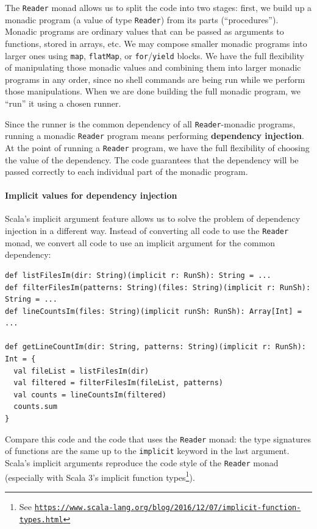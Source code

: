 The \lstinline!Reader! monad allows us to split the code into two
stages: first, we build up a monadic program (a value of type \lstinline!Reader!)
from its parts (\textsf{``}procedures\textsf{''}). Monadic programs are ordinary values
that can be passed as arguments to functions, stored in arrays, etc.
We may compose smaller monadic programs into larger ones using \lstinline!map!,
\lstinline!flatMap!, or \lstinline!for!/\lstinline!yield! blocks.
We have the full flexibility of manipulating those monadic values
and combining them into larger monadic programs in any order, since
no shell commands are being run while we perform those manipulations.
When we are done building the full monadic program, we \textsf{``}run\textsf{''} it
using a chosen runner.

Since the runner is the common dependency of all \lstinline!Reader!-monadic
programs, running a monadic \lstinline!Reader! program means performing
\textbf{dependency injection}. At the
point of running a \lstinline!Reader! program, we have the full flexibility
of choosing the value of the dependency. The code guarantees that
the dependency will be passed correctly to each individual part of
the monadic program.

\paragraph{Implicit values for dependency injection}

Scala\textsf{'}s implicit argument feature allows us to solve the problem of
dependency injection in a different way. Instead of converting all
code to use the \lstinline!Reader! monad, we convert all code to
use an implicit argument for the common dependency:
\begin{lstlisting}
def listFilesIm(dir: String)(implicit r: RunSh): String = ...
def filterFilesIm(patterns: String)(files: String)(implicit r: RunSh): String = ...
def lineCountsIm(files: String)(implicit runSh: RunSh): Array[Int] = ...

def getLineCountIm(dir: String, patterns: String)(implicit r: RunSh): Int = {
  val fileList = listFilesIm(dir)
  val filtered = filterFilesIm(fileList, patterns)
  val counts = lineCountsIm(filtered)
  counts.sum
}
\end{lstlisting}
Compare this code and the code that uses the \lstinline!Reader! monad:
the type signatures of functions are the same up to the \lstinline!implicit!
keyword in the last argument. Scala\textsf{'}s implicit arguments reproduce
the code style of the \lstinline!Reader! monad (especially with Scala
3\textsf{'}s implicit function types\footnote{See \texttt{\href{https://www.scala-lang.org/blog/2016/12/07/implicit-function-types.html}{https://www.scala-lang.org/blog/2016/12/07/implicit-function-types.html}}}).

